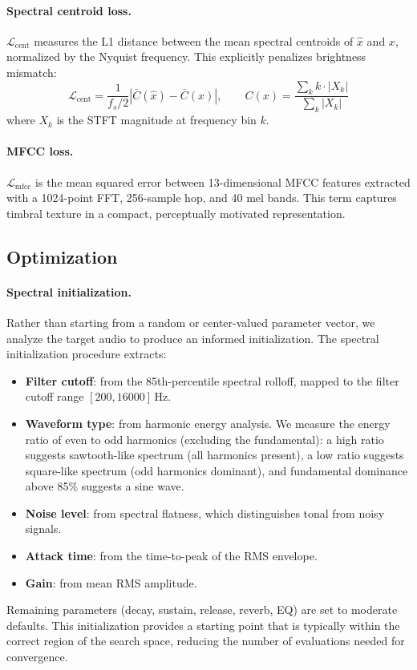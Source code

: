 \paragraph{Spectral centroid loss.} $\mathcal{L}_{\text{cent}}$ measures the L1 distance between the mean spectral centroids of $\hat{x}$ and $x$, normalized by the Nyquist frequency. This explicitly penalizes brightness mismatch:
\begin{equation}
    \mathcal{L}_{\text{cent}} = \frac{1}{f_s / 2} \left| \bar{C}(\hat{x}) - \bar{C}(x) \right|, \qquad C(x) = \frac{\sum_k k \cdot |X_k|}{\sum_k |X_k|}
\end{equation}
where $X_k$ is the STFT magnitude at frequency bin $k$.

\paragraph{MFCC loss.} $\mathcal{L}_{\text{mfcc}}$ is the mean squared error between 13-dimensional MFCC features extracted with a 1024-point FFT, 256-sample hop, and 40 mel bands. This term captures timbral texture in a compact, perceptually motivated representation.

\subsection{Optimization}
\label{sec:optimization}

\paragraph{Spectral initialization.} Rather than starting from a random or center-valued parameter vector, we analyze the target audio to produce an informed initialization. The spectral initialization procedure extracts:
\begin{itemize}
    \item \textbf{Filter cutoff}: from the 85th-percentile spectral rolloff, mapped to the filter cutoff range $[200, 16000]$\,Hz.
    \item \textbf{Waveform type}: from harmonic energy analysis. We measure the energy ratio of even to odd harmonics (excluding the fundamental): a high ratio suggests sawtooth-like spectrum (all harmonics present), a low ratio suggests square-like spectrum (odd harmonics dominant), and fundamental dominance above 85\% suggests a sine wave.
    \item \textbf{Noise level}: from spectral flatness, which distinguishes tonal from noisy signals.
    \item \textbf{Attack time}: from the time-to-peak of the RMS envelope.
    \item \textbf{Gain}: from mean RMS amplitude.
\end{itemize}
Remaining parameters (decay, sustain, release, reverb, EQ) are set to moderate defaults. This initialization provides a starting point that is typically within the correct region of the search space, reducing the number of evaluations needed for convergence.

